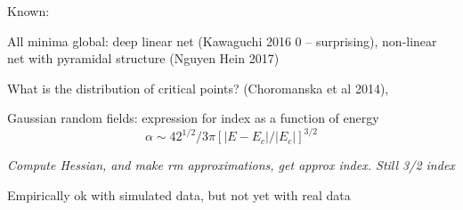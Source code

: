\documentclass[english]{article}
\begin{document}
Known:

All minima global: deep linear net (Kawaguchi 2016 0 -- surprising), non-linear net with pyramidal structure (Nguyen Hein 2017)

\item 
What is the distribution of critical  points? (Choromanska et al 2014), 

Gaussian random fields: expression for index as a function of energy $$\alpha \sim 42^{1/2}/3\pi [|E - E_c|/|E_c|]^{3/2}$$

\emph{Compute Hessian, and make rm approximations, get approx index. Still 3/2 index}

Empirically ok with simulated data, but not yet with real data
%
%
%
%
%
\eenum
\end{document}

